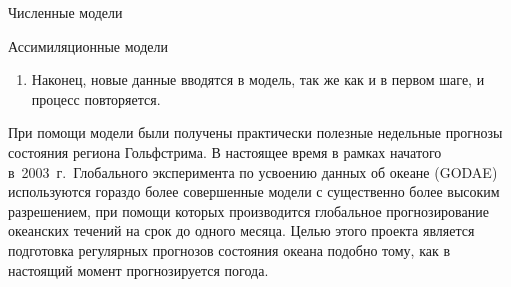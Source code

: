 \begin{chapter}{Численные модели}
\begin{section}{Ассимиляционные модели}
\begin{enumerate}
\item
Наконец, новые данные вводятся в модель, так же как и в первом
шаге, и процесс повторяется.
%
\end{enumerate}
При помощи модели были получены практически полезные недельные прогнозы
состояния региона Гольфстрима. В настоящее
время в рамках начатого в~2003~г.\ Глобального эксперимента по усвоению 
данных об океане (GODAE)%
используются гораздо более совершенные модели с существенно более 
высоким разрешением, при помощи которых производится глобальное 
прогнозирование океанских течений на срок до одного месяца.  
Целью этого проекта является подготовка регулярных прогнозов состояния 
океана подобно тому, как в настоящий момент прогнозируется погода.
%



\end{section}
\end{chapter}
